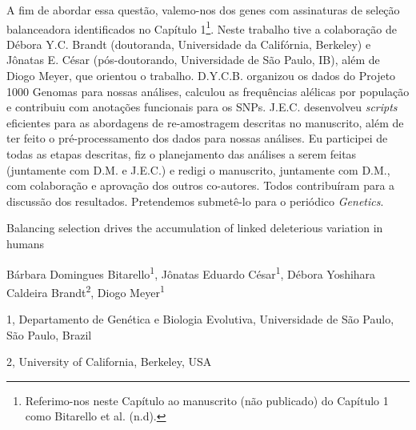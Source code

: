 \begin{refsection}
A fim de abordar essa questão, valemo-nos dos genes com assinaturas de seleção balanceadora identificados no Capítulo 1\footnote{Referimo-nos neste Capítulo ao manuscrito (não publicado) do Capítulo 1 como Bitarello et al. (n.d).}. Neste trabalho tive a colaboração de Débora Y.C. Brandt (doutoranda, Universidade da Califórnia, Berkeley) e Jônatas E. César (pós-doutorando, Universidade de São Paulo, IB), além de Diogo Meyer, que orientou o trabalho. D.Y.C.B. organizou os dados do Projeto 1000 Genomas para nossas análises, calculou as frequências alélicas por população e contribuiu com anotações funcionais para os SNPs. J.E.C. desenvolveu \emph{scripts} eficientes para as abordagens de re-amostragem descritas no manuscrito, além de ter feito o pré-processamento dos dados para nossas análises. Eu participei de todas as etapas descritas, fiz o planejamento das análises a serem feitas (juntamente com D.M. e J.E.C.) e redigi o manuscrito, juntamente com D.M., com colaboração e aprovação dos outros co-autores. Todos contribuíram para a discussão dos resultados. Pretendemos submetê-lo para o periódico \emph{Genetics}.

\newpage
\begin{otherlanguage}{english}

\begin{center}

\LARGE{Balancing selection drives the accumulation of linked deleterious variation in humans}


\end{center}

\begin{center}
Bárbara Domingues Bitarello\textsuperscript{1}, Jônatas Eduardo César\textsuperscript{1}, Débora Yoshihara Caldeira Brandt\textsuperscript{2}, Diogo Meyer\textsuperscript{1}
\end{center}

\footnotesize{1, Departamento de Genética e Biologia Evolutiva, Universidade de São Paulo, São Paulo, Brazil}

\footnotesize{2, University of California, Berkeley, USA} 


\end{otherlanguage}
\end{refsection}
